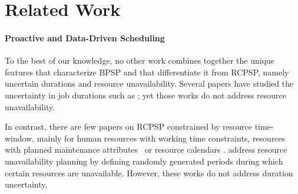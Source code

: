 \section{Related Work}
\label{sec:related}

\paragraph{Proactive and Data-Driven Scheduling}



To the best of our knowledge, no other work combines together the unique features that characterize BPSP and that differentiate it from RCPSP, namely uncertain durations and resource unavailability.
Several papers have studied the uncertainty in job durations such as \cite{satic2022performance,liu2020multi,hauder2020resource,chen2019research,beck2007proactive,GomezBD23}; yet those works do not address resource unavailability.

In contrast, there are few papers on RCPSP constrained by resource time-window, mainly for human resources with working time constraints, resources with planned maintenance attributes~\cite{ding2023extensions} or resource calendars \cite{kreter2018mixed}. \cite{tian2018optimizing} address resource unavailability planning by defining randomly generated periods during which certain resources are unavailable. However, these works do not address duration uncertainty.


